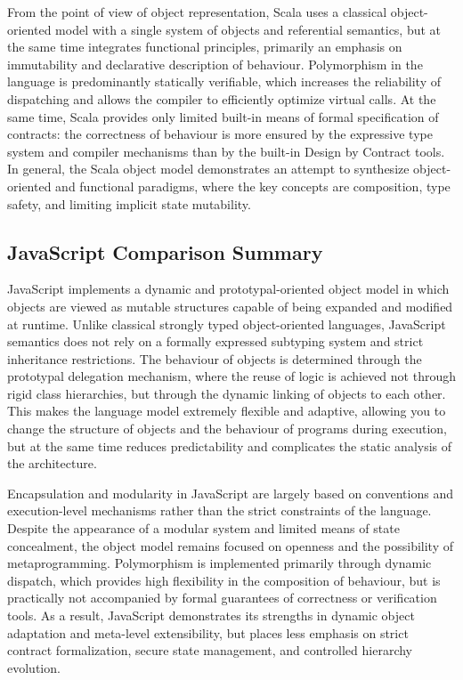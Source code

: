 From the point of view of object representation, Scala uses a classical object-oriented model with a single system of objects and referential semantics, but at the same time integrates functional principles, primarily an emphasis on immutability and declarative description of behaviour. Polymorphism in the language is predominantly statically verifiable, which increases the reliability of dispatching and allows the compiler to efficiently optimize virtual calls. At the same time, Scala provides only limited built-in means of formal specification of contracts: the correctness of behaviour is more ensured by the expressive type system and compiler mechanisms than by the built-in Design by Contract tools. In general, the Scala object model demonstrates an attempt to synthesize object-oriented and functional paradigms, where the key concepts are composition, type safety, and limiting implicit state mutability.

\subsection{JavaScript Comparison Summary}

JavaScript implements a dynamic and prototypal-oriented object model in which objects are viewed as mutable structures capable of being expanded and modified at runtime. Unlike classical strongly typed object-oriented languages, JavaScript semantics does not rely on a formally expressed subtyping system and strict inheritance restrictions. The behaviour of objects is determined through the prototypal delegation mechanism, where the reuse of logic is achieved not through rigid class hierarchies, but through the dynamic linking of objects to each other. This makes the language model extremely flexible and adaptive, allowing you to change the structure of objects and the behaviour of programs during execution, but at the same time reduces predictability and complicates the static analysis of the architecture. 

Encapsulation and modularity in JavaScript are largely based on conventions and execution-level mechanisms rather than the strict constraints of the language. Despite the appearance of a modular system and limited means of state concealment, the object model remains focused on openness and the possibility of metaprogramming. Polymorphism is implemented primarily through dynamic dispatch, which provides high flexibility in the composition of behaviour, but is practically not accompanied by formal guarantees of correctness or verification tools. As a result, JavaScript demonstrates its strengths in dynamic object adaptation and meta-level extensibility, but places less emphasis on strict contract formalization, secure state management, and controlled hierarchy evolution.

